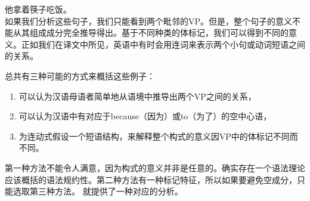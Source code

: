 \begin{exe}
\begin{xlist}[iv.]
\begin{exe}
\begin{xlist}[iv.]
\ex
     他拿着筷子吃饭。 \\
\zl
如果我们分析这些句子，我们只能看到两个毗邻的VP。但是，整个句子的意义不能从其组成成分完全推导得出。基于不同种类的体标记，我们可以得到不同的意义。正如我们在译文中所见，英语中有时会用连词来表示两个小句或动词短语之间的关系。

总共有三种可能的方式来概括这些例子：
\begin{enumerate}
\item 可以认为汉语母语者简单地从语境中推导出两个VP之间的关系，
\item 可以认为汉语中有对应于because（因为）或to（为了）的空中心语，
\item 为连动式假设一个短语结构，来解释整个构式的意义因VP中的体标记不同而不同。
\end{enumerate}
第一种方法不能令人满意，因为构式的意义并非是任意的。确实存在一个语法理论应该概括的语法规约性。第二种方法有一种标记特征，所以如果要避免空成分，只能选取第三种方法。 \citet{ML2009a}就提供了一种对应的分析。


\end{xlist}
\end{exe}
\end{xlist}
\end{exe}
